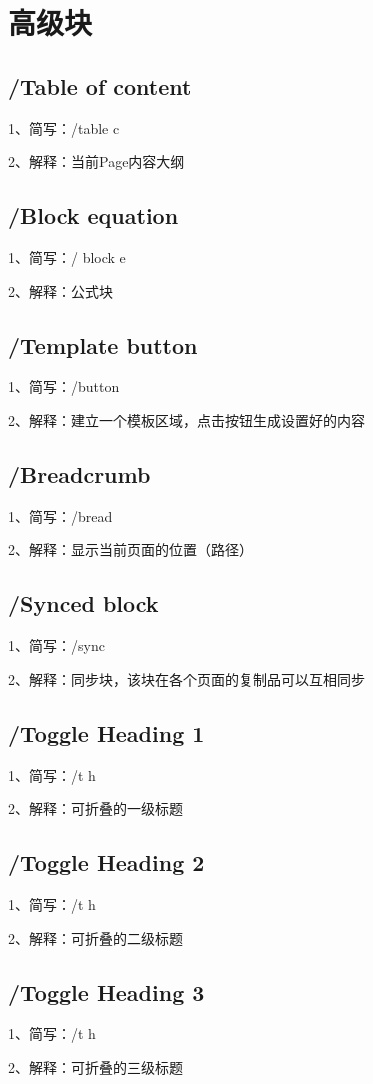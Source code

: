 \chapter{高级块}

\section{/Table of content}

1、简写：/table c

2、解释：当前Page内容大纲

\section{/Block equation}

1、简写：/ block e

2、解释：公式块

\section{/Template button}

1、简写：/button

2、解释：建立一个模板区域，点击按钮生成设置好的内容

\section{/Breadcrumb}

1、简写：/bread

2、解释：显示当前页面的位置（路径）

\section{/Synced block}

1、简写：/sync

2、解释：同步块，该块在各个页面的复制品可以互相同步

\section{/Toggle Heading 1}

1、简写：/t h

2、解释：可折叠的一级标题

\section{/Toggle Heading 2}

1、简写：/t h

2、解释：可折叠的二级标题

\section{/Toggle Heading 3}

1、简写：/t h

2、解释：可折叠的三级标题

